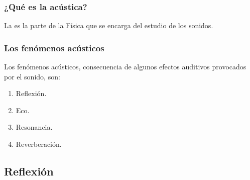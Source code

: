 \documentclass[14pt]{beamer}
\begin{document}
\begin{frame}
\frametitle{¿Qué es la acústica?}
La  es la parte de la Física que se encarga del estudio de los sonidos.
\end{frame}
\begin{frame}
\frametitle{Los fenómenos acústicos}
Los fenómenos acústicos, consecuencia de algunos efectos auditivos provocados por el sonido, son:
\pause
{}
\begin{enumerate}[<+->]
\item Reflexión.
\item Eco.
\item Resonancia.
\item Reverberación.
\end{enumerate}
\end{frame}

\subsection{Reflexión}
\end{document}
